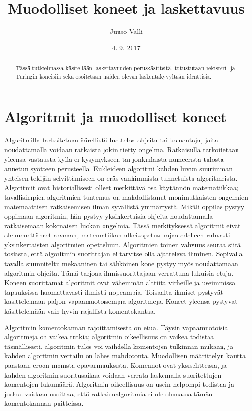 \documentclass[a4paper, 12pt]{article}
\theoremstyle{definition}
\theoremstyle{plain}
\begin{document}
\title{Muodolliset koneet ja laskettavuus}
\author{Juuso Valli}
\date{4. 9. 2017}

\maketitle

\begin{abstract}
Tässä tutkielmassa käsitellään laskettavuuden peruskäsitteitä, 
tutustutaan rekisteri- ja Turingin koneisiin 
sekä osoitetaan näiden olevan laskentakyvyltään identtisiä.
\end{abstract}

\tableofcontents

\newpage

\section{Algoritmit ja muodolliset koneet}
Algoritmilla tarkoitetaan äärellistä luetteloa ohjeita tai komentoja, joita noudattamalla voidaan ratkaista jokin tietty ongelma. Ratkaisulla tarkoitetaan yleensä vastausta kyllä-ei kysymykseen tai jonkinlaista numeerista tulosta annetun syötteen perusteella. Eukleideen algoritmi kahden luvun suurimman yhteisen tekijän selvittämiseen on eräs vanhimmista tunnetuista algoritmeista. Algoritmit ovat historiallisesti olleet merkittävä osa käytännön matematiikkaa; tavallisimpien algoritmien tuntemus on mahdollistanut monimutkaisten ongelmien matemaattisen ratkaisemisen ilman syvällistä ymmärrystä. Mikäli oppilas pystyy oppimaan algoritmin, hän pystyy yksinkertaisia ohjeita noudattamalla ratkaisemaan kokonaisen luokan ongelmia. Tässä merkityksessä algoritmit eivät ole menettäneet arvoaan, matematiikan alkeisopetus nojaa edelleen vahvasti yksinkertaisten algoritmien opetteluun. Algoritmien toinen vahvuus seuraa siitä tosiasta, että algoritmin suorittajan ei tarvitse olla ajatteleva ihminen. Sopivalla tavalla suunniteltu mekaaninen tai sähköinen kone pystyy myös noudattamaan algoritmin ohjeita. Tämä tarjoaa ihmissuorittajaan verrattuna lukuisia etuja. Koneen suorittamat algoritmit ovat vähemmän alttiita virheille ja useimmissa tapauksissa huomattavasti ihmistä nopeampia. Toisaalta ihmiset pystyvät käsittelemään paljon vapaamuotoisempia algoritmeja. Koneet yleensä pystyvät käsittelemään vain hyvin rajallista komentokantaa. 

Algoritmin komentokannan rajoittamisesta on etua. Täysin vapaamuotoisia algoritmeja on vaikea tutkia; algoritmin oikeellisuus on vaikea todistaa täsmällisesti, algoritmin tulos voi vaihdella komentojen tulkinnan mukaan, ja kahden algoritmin vertailu on lähes mahdotonta. Muodollisen määrittelyn kautta päästään eroon monista epävarmuuksista. Komennot ovat yksiselitteisiä, ja kahden algoritmin suoritusaikaa voidaan verrata laskemalla suoritettujen komentojen lukumäärä. Algoritmin oikeellisuus on usein helpompi todistaa ja joskus voidaan osoittaa, että ratkaisualgoritmia ei ole olemassa tämän komentokannan puitteissa.
\end{document}
